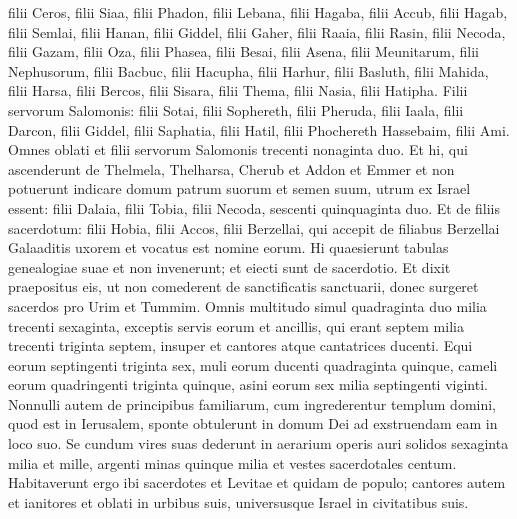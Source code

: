 \begin{biblechapter}
\verse filii Ceros, filii Siaa, filii Phadon, 
\verse filii Lebana, filii Hagaba, filii Accub, 
\verse filii Hagab, filii Semlai, filii Hanan, 
\verse filii Giddel, filii Gaher, filii Raaia,  
\verse filii Rasin, filii Necoda, filii Gazam, 
\verse filii Oza, filii Phasea, filii Besai, 
\verse filii Asena, filii Meunitarum, filii Nephusorum, 
\verse filii Bacbuc, filii Hacupha, filii Harhur, 
\verse filii Basluth, filii Mahida, filii Harsa, 
\verse filii Bercos, filii Sisara, filii Thema, 
\verse filii Nasia, filii Hatipha. 
\verse Filii servorum Salomonis: filii Sotai, filii Sophereth, filii Pheruda, 
\verse filii Iaala, filii Darcon, filii Giddel, 
\verse filii Saphatia, filii Hatil, filii Phochereth Hassebaim, filii Ami. 
\verse Omnes oblati et filii servorum Salomonis trecenti nonaginta duo. 
\verse Et hi, qui ascenderunt de Thelmela, Thelharsa, Cherub et Addon et Emmer et non potuerunt indicare domum patrum suorum et semen suum, utrum ex Israel essent: 
\verse filii Dalaia, filii Tobia, filii Necoda, sescenti quinquaginta duo. 
\verse Et de filiis sacerdotum: filii Hobia, filii Accos, filii Berzellai, qui accepit de filiabus Berzellai Galaaditis uxorem et vocatus est nomine eorum.  
\verse Hi quaesierunt tabulas genealogiae suae et non invenerunt; et eiecti sunt de sacerdotio. 
\verse Et dixit praepositus eis, ut non comederent de sanctificatis sanctuarii, donec surgeret sacerdos pro Urim et Tummim. 
\verse Omnis multitudo simul quadraginta duo milia trecenti sexaginta, 
\verse exceptis servis eorum et ancillis, qui erant septem milia trecenti triginta septem, insuper et cantores atque cantatrices ducenti. 
\verse Equi eorum septingenti triginta sex, muli eorum ducenti quadraginta quinque, 
\verse cameli eorum quadringenti triginta quinque, asini eorum sex milia septingenti viginti. 
\verse Nonnulli autem de principibus familiarum, cum ingrederentur templum domini, quod est in Ierusalem, sponte obtulerunt in domum Dei ad exstruendam eam in loco suo. 
\verse Se cundum vires suas dederunt in aerarium operis auri solidos sexaginta milia et mille, argenti minas quinque milia et vestes sacerdotales centum. 
\verse Habitaverunt ergo ibi sacerdotes et Levitae et quidam de populo; cantores autem et ianitores et oblati in urbibus suis, universusque Israel in civitatibus suis. 
\end{biblechapter}

